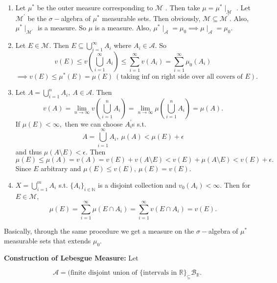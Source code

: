\documentclass{functionspaces}
\begin{document}
\begin{enumerate}
    \item Let $\mu^{*}$ be the outer measure corresponding to $\mathcal{M}$ . Then take $\mu = \mu^{*} \mid_{\mathcal{M}}$ . Let $\mathcal{M}^{\prime}$ be the $\sigma-$algebra of $\mu^{*}$ measurable sets. Then obviously, $\mathcal{M} \subseteq \mathcal{M}^{\prime}$. Also, $\mu^{*} \mid_{\mathcal{M}^{\prime}}$ is a measure. So $\mu$ is a measure. Also, $\mu^{*} \mid_{\mathcal{A}} = \mu_{0} \implies \mu \mid_{\mathcal{A}} = \mu_{0}$.
    
    \item Let $E \in \mathcal{M}$. Then $E \subseteq \bigcup_{i=1}^{\infty} A_{i}$ where $A_{i} \in \mathcal{A}$. So
    \[
    v(E) \leq v\left(\bigcup_{i=1}^{\infty} A_{i}\right) \leq \sum_{i=1}^{\infty} v(A_{i}) = \sum_{i=1}^{\infty} \mu_{0}(A_{i})
    \]
    \[
    \implies v(E) \leq \mu^{*}(E) = \mu(E)\ (\text{taking inf on right side over all covers of } E).
    \]
    
    \item Let $A = \bigcup_{i=1}^{n} A_{i},\ A \in \mathcal{A}.$ Then
    \[
    v(A) = \lim_{n \to \infty} v\left(\bigcup_{i=1}^{n} A_{i}\right) = \lim_{n \to \infty} \mu\left(\bigcup_{i=1}^{n} A_{i}\right) = \mu(A).
    \]
    If $\mu(E) < \infty,$ then we can choose $A^{\prime}_{i}$s s.t.
    \[
    A = \bigcup_{i=1}^{\infty} A_{i},\ \mu(A) < \mu(E) + \epsilon
    \]
    and thus $\mu(A \setminus E) < \epsilon.$ Then
    \[
    \mu(E) \leq \mu(A) = v(A) = v(E) + v(A \setminus E) < v(E) + \mu(A \setminus E) < v(E) + \epsilon.
    \]
    Since $E$ arbitrary and $\mu(E) \leq v(E),\ \mu(E) = v(E).$
    
    \item $X = \bigcup_{i=1}^{m} A_{i}$ s.t. $\{A_{i}\}_{i \in \mathbb{N}}$ is a disjoint collection and $v_{0}(A_{i}) < \infty.$ Then for $E \in \mathcal{M}$,
    \[
    \mu(E) = \sum_{i=1}^{\infty} \mu(E \cap A_{i}) = \sum_{i=1}^{\infty} v(E \cap A_{i}) = v(E).
    \]
\end{enumerate}

\begin{remark}
Basically, through the same procedure we get a measure on the $\sigma-$algebra of $\mu^{*}$ measurable sets that extends $\mu_{0}$.
\end{remark}

\textbf{Construction of Lebesgue Measure:} Let

\[
\mathcal{A} = (\text{finite disjoint union of } \{\text{intervals in } \mathbb{R}\}_{\subseteq} \mathcal{B}_{\mathbb{R}}.
\]
\end{document}
